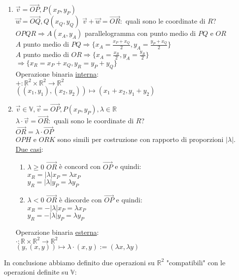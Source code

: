 \documentclass{article}
\newcommand{\ul}[1]{\underline{#1}}
\newcommand{\R}{\mathbb{R}}
\begin{document}
\begin{enumerate}
	\item $\vec{v}=\vec{OP},P(x_P,y_P)$\\
	      $\vec{w}=\vec{OQ},Q(x_Q,y_Q)$
	      $\vec{v}+\vec{w}=\vec{OR}:$ quali sono le coordinate di $R$?\\
	      $OPQR\Rightarrow A(x_A,y_A)$ parallelogramma con punto medio di $PQ$ e $OR$\\
	      $A$ punto medio di $PQ\Rightarrow\{x_A=\frac{x_P+x_Q}{2},y_A=\frac{y_P+x_Q}{2}\}$\\
	      $A$ punto medio di $OR\Rightarrow\{x_A=\frac{x_R}{2},y_A=\frac{y_R}{2}\}$\\
	      $\Rightarrow\{x_R=x_P+x_Q,y_R=y_P+y_Q\}$\\
	      Operazione binaria \ul{interna}:\\
	      $+:\R^2\times\R^2\rightarrow\R^2$\\
	      $((x_1,y_1),(x_2,y_2))\mapsto(x_1+x_2,y_1+y_2)$
	\item $\vec{v}\in\mathbb{V},\vec{v}=\vec{OP},P(x_P,y_P),\lambda\in\R$\\
	      $\lambda\cdot\vec{v}=\vec{OR}:$ quali sono le coordinate di $R$?\\
	      $\vec{OR}=\lambda\cdot\vec{OP}$\\
	      $OPH$ e $ORK$ sono simili per costruzione con rapporto di proporzioni $|\lambda|$.\\
	      \ul{Due casi}:
	      \begin{enumerate}
		      \item $\lambda\ge0$ $\vec{OR}$ è concord con $\vec{OP}$ e quindi:\\
		            $x_R=|\lambda|x_P=\lambda x_P$\\
		            $y_R=|\lambda|y_P=\lambda y_P$
		      \item $\lambda<0$ $\vec{OR}$ è discorde con $\vec{OP}$ e quindi:\\
		            $x_R=-|\lambda|x_P=\lambda x_P$\\
		            $y_R=-|\lambda|y_P=\lambda y_P$
	      \end{enumerate}
	      Operazione binaria \ul{esterna}:\\
	      $\cdot:\R\times\R^2\rightarrow\R^2$\\
	      \hspace*{0.1em}$(y,(x,y))\mapsto\lambda\cdot(x,y):=(\lambda x,\lambda y)$
\end{enumerate}
In conclusione abbiamo definito due operazioni su $\R^2$ "compatibili" con le operazioni definite su $\mathbb{V}$:
\end{document}
